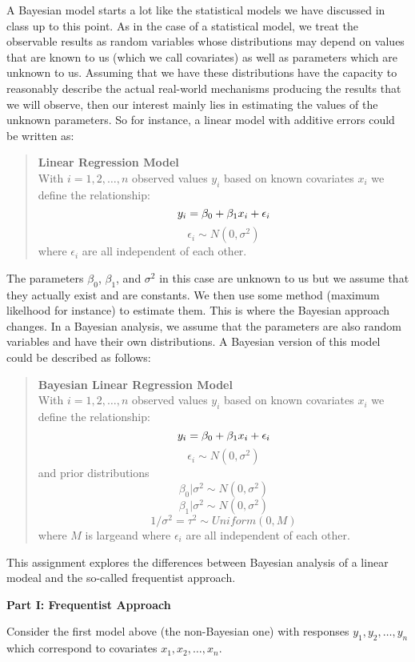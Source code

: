 \documentclass[11pt]{article}\usepackage[]{graphicx}\usepackage[]{color}
\begin{document}
A Bayesian model starts a lot like the statistical models we have discussed in class up to this point. As in the case of a statistical model, we treat the observable results as random variables whose distributions may depend on values that are known to us (which we call covariates) as well as parameters which are unknown to us. Assuming that we have these distributions have the capacity to reasonably describe the actual real-world mechanisms producing the results that we will observe, then our interest mainly lies in estimating the values of the unknown parameters. So for instance, a linear model with additive errors could be written as:
\begin{quote}
\textbf{Linear Regression Model}\\
With $i = 1, 2, \ldots, n$ observed values $y_i$ based on known covariates $x_i$ we define the relationship:
\[
   y_{i} = \beta_0 + \beta_1 x_i + \epsilon_i \\
\]
\[
   \epsilon_i \sim N(0, \sigma^2)
\]
where $\epsilon_i$ are all independent of each other.
\end{quote}
The parameters $\beta_0$, $\beta_1$, and $\sigma^2$ in this case are unknown to us but we assume that they actually exist and are constants. We then use some method (maximum likelhood for instance) to estimate them. This is where the Bayesian approach changes. In a Bayesian analysis, we assume that the parameters are also random variables and have their own distributions. A Bayesian version of this model could be described as follows:
\begin{quote}
\textbf{Bayesian Linear Regression Model}\\
With $i = 1, 2, \ldots, n$ observed values $y_i$ based on known covariates $x_i$ we define the relationship:
\[
   y_{i} = \beta_0 + \beta_1 x_i + \epsilon_i \\
\]
\[
   \epsilon_i \sim N(0, \sigma^2)
\]
and prior distributions
\[
   \beta_0 | \sigma^2 \sim N(0, \sigma^2)
\]
\[
   \beta_1 | \sigma^2 \sim N(0, \sigma^2)
\]
\[
   1/\sigma^2 = \tau^2 \sim Uniform(0, M)
\]
where $M$ is largeand where $\epsilon_i$ are all independent of each other.
\end{quote}

This assignment explores the differences between Bayesian analysis of a linear modeal and the so-called frequentist approach.

\textbf{Part I: Frequentist Approach}

Consider the first model above (the non-Bayesian one) with responses $y_1, y_2, \ldots, y_n$ which correspond to covariates $x_1, x_2, \ldots, x_n$.
\end{document}
